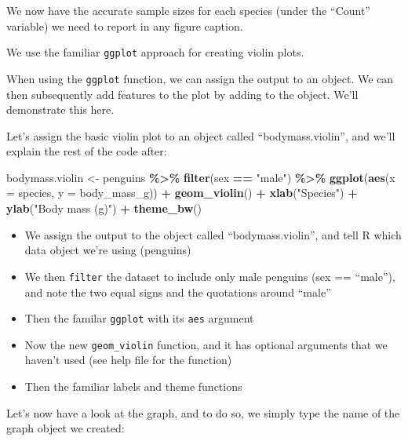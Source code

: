 \documentclass[
]{book}
\newenvironment{Shaded}{\begin{snugshade}}{\end{snugshade}}
\newcommand{\AttributeTok}[1]{\textcolor[rgb]{0.13,0.29,0.53}{#1}}
\newcommand{\FunctionTok}[1]{\textcolor[rgb]{0.13,0.29,0.53}{\textbf{#1}}}
\newcommand{\NormalTok}[1]{#1}
\newcommand{\OtherTok}[1]{\textcolor[rgb]{0.56,0.35,0.01}{#1}}
\newcommand{\SpecialCharTok}[1]{\textcolor[rgb]{0.81,0.36,0.00}{\textbf{#1}}}
\newcommand{\StringTok}[1]{\textcolor[rgb]{0.31,0.60,0.02}{#1}}
\providecommand{\tightlist}{%
  \setlength{\itemsep}{0pt}\setlength{\parskip}{0pt}}
\begin{document}
We now have the accurate sample sizes for each species (under the ``Count'' variable) we need to report in any figure caption.

We use the familiar \texttt{ggplot} approach for creating violin plots.

When using the \texttt{ggplot} function, we can assign the output to an object. We can then subsequently add features to the plot by adding to the object. We'll demonstrate this here.

Let's assign the basic violin plot to an object called ``bodymass.violin'', and we'll explain the rest of the code after:

\begin{Shaded}
\begin{Highlighting}[]
\NormalTok{bodymass.violin }\OtherTok{\textless{}{-}}\NormalTok{ penguins }\SpecialCharTok{\%\textgreater{}\%} 
  \FunctionTok{filter}\NormalTok{(sex }\SpecialCharTok{==} \StringTok{"male"}\NormalTok{) }\SpecialCharTok{\%\textgreater{}\%}
  \FunctionTok{ggplot}\NormalTok{(}\FunctionTok{aes}\NormalTok{(}\AttributeTok{x =}\NormalTok{ species, }\AttributeTok{y =}\NormalTok{ body\_mass\_g)) }\SpecialCharTok{+}
  \FunctionTok{geom\_violin}\NormalTok{() }\SpecialCharTok{+}
  \FunctionTok{xlab}\NormalTok{(}\StringTok{"Species"}\NormalTok{) }\SpecialCharTok{+}
  \FunctionTok{ylab}\NormalTok{(}\StringTok{"Body mass (g)"}\NormalTok{) }\SpecialCharTok{+}
  \FunctionTok{theme\_bw}\NormalTok{()}
\end{Highlighting}
\end{Shaded}

\begin{itemize}
\tightlist
\item
  We assign the output to the object called ``bodymass.violin'', and tell R which data object we're using (penguins)
\item
  We then \texttt{filter} the dataset to include only male penguins (sex == ``male''), and note the two equal signs and the quotations around ``male''
\item
  Then the familar \texttt{ggplot} with its \texttt{aes} argument
\item
  Now the new \texttt{geom\_violin} function, and it has optional arguments that we haven't used (see help file for the function)
\item
  Then the familiar labels and theme functions
\end{itemize}

Let's now have a look at the graph, and to do so, we simply type the name of the graph object we created:
\end{document}
